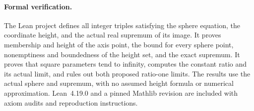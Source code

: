 \documentclass[11pt]{article}
\begin{document}
\paragraph{Formal verification.}
The Lean project defines all integer triples satisfying the sphere equation, the coordinate height, and the actual real supremum of its image. It proves membership and height of the axis point, the bound for every sphere point, nonemptiness and boundedness of the height set, and the exact supremum. It proves that square parameters tend to infinity, computes the constant ratio and its actual limit, and rules out both proposed ratio-one limits. The results use the actual sphere and supremum, with no assumed height formula or numerical approximation. Lean~4.19.0 and a pinned Mathlib revision are included with axiom audits and reproduction instructions.
\end{document}
